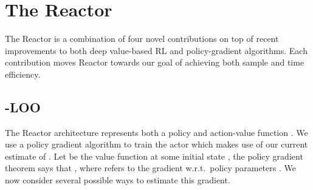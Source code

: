 \documentclass{article}
\begin{document}
\iffalse 
\subsection{Noisy Networks}\label{sec:noisy}
Balancing exploration and exploitation is an essential problem in reinforcement 
learning.
Local exploration, achieved by dithering approaches where 
decorrelated (and, in the case of  -greedy, state-independent) noise 
is added to the policy at every step, fail to explore sufficiently in 
challenging domains.

Instead, noisy networks add parametrized noise to network weights to drive 
consistent exploration \citep{fortunato2017noisy}.
The parameters of noise are trained using the existing algorithm's loss. This 
enables the agent to utilize a 
state-dependent adaptive exploration strategy which only explores in those 
states where there is uncertainty about the optimal policy or value function. 

Noisy networks are implemented by replacing some linear layers with the 
noisy-linear layers defined as 
follows. Consider a linear layer of a neural network with  inputs and  
outputs represented by 
, where  is the layer input, 
 
the weight matrix, and  the bias. The corresponding noisy 
linear layer is defined as:

where   and  
replace  and  respectively.  The parameters 
, ,  and  are learnable whereas 
  and  are 
noise random variables \citep{fortunato2017noisy}.
\footnote{As for the specific choices of this distribution we choose factorised 
Gaussian 
noise.}
\fi 

\section{The Reactor}\label{sec:reactor}
The Reactor is a combination of four novel contributions on top of recent 
improvements to both 
deep value-based RL and policy-gradient algorithms. 
Each contribution moves Reactor towards our goal of achieving both sample and time efficiency.

\subsection{-LOO}\label{sec:betaloo}

The Reactor architecture represents both a policy  and action-value function 
. We use a policy gradient algorithm to train the actor  which 
makes use of our current estimate  of .  
Let  be the value function at some initial state , the 
policy gradient theorem says that , where  refers to the gradient w.r.t.~policy parameters \citep{Sutton00policygradient}. We now 
consider several possible ways to estimate this gradient.
\end{document}
